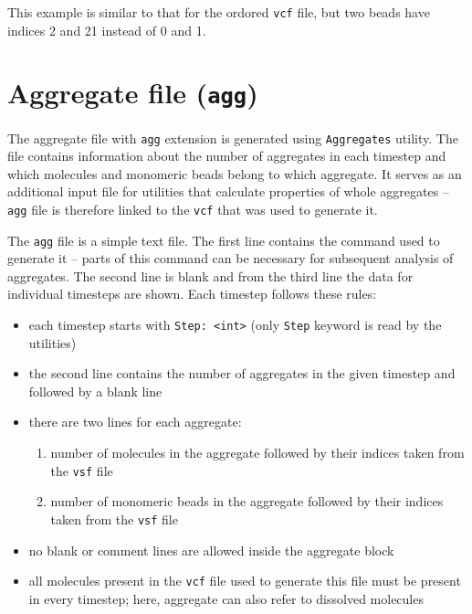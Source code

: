 This example is similar to that for the ordored \texttt{vcf} file, but two
beads have indices 2 and 21 instead of 0 and 1. %

\section{Aggregate file (\texttt{agg})} \label{sec:AggFile} %

The aggregate file with \texttt{agg} extension is generated using
\texttt{Aggregates} utility. The file
contains information about the number of aggregates in each timestep and
which molecules and monomeric beads belong to which aggregate. It serves as
an additional input file for utilities that calculate properties of whole
aggregates -- \texttt{agg} file is therefore linked to the \texttt{vcf}
that was used to generate it.

The \texttt{agg} file is a simple text file. The first line contains the
command used to generate it -- parts of this command can be necessary for
subsequent analysis of aggregates. The second line is blank and from the
third line the data for individual timesteps are shown. Each timestep
follows these rules:

\begin{itemize}[topsep=0pt,itemsep=0pt]
  \item each timestep starts with \texttt{Step: <int>} (only \texttt{Step}
    keyword is read by the utilities)
  \item the second line contains the number of aggregates in the given
    timestep and followed by a blank line
  \item there are two lines for each aggregate:
  \begin{enumerate}[topsep=0pt,itemsep=0pt]
    \item number of molecules in the aggregate followed by their indices
      taken from the \texttt{vsf} file
    \item number of monomeric beads in the aggregate followed by their
      indices taken from the \texttt{vsf} file
  \end{enumerate}
  \item no blank or comment lines are allowed inside the aggregate block
  \item all molecules present in the \texttt{vcf} file used to generate
    this file must be present in every timestep; here, aggregate can also
    refer to dissolved molecules
\end{itemize}

